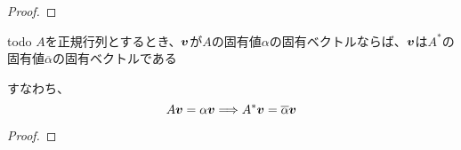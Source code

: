 \documentclass[../../../topic_linear-algebra]{subfiles}
\begin{document}
\begin{proof}
\end{proof}

\br

\begin{theorem}{todo}
  $A$を正規行列とするとき、$\vb*{v}$が$A$の固有値$\alpha$の固有ベクトルならば、$\vb*{v}$は$A^*$の固有値$\overline{\alpha}$の固有ベクトルである

  すなわち、
  \begin{equation*}
    A\vb*{v} = \alpha \vb*{v} \Longrightarrow A^*\vb*{v} = \overline{\alpha} \vb*{v}
  \end{equation*}
\end{theorem}

\begin{proof}
\end{proof}
\end{document}
